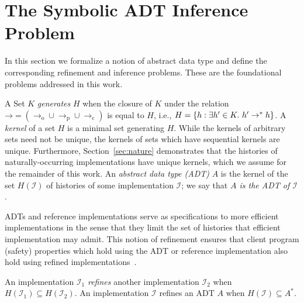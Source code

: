 \section{The Symbolic ADT Inference Problem}
\label{sec:inference}

In this section we formalize a notion of abstract data type and define the
corresponding refinement and inference problems. These are the foundational
problems addressed in this work.

A Set $K$ \emph{generates} $H$ when the closure of $K$ under the relation
$\mathord\to = (\to_\mathrm{o} \cup \to_\mathrm{p} \cup \to_\mathrm{c})$
is equal to $H$, i.e., $H = {\{{ h : \exists h' \in K.\ h' \to^\ast h }\}}$.
A \emph{kernel} of a set $H$ is a minimal set generating $H$. While the kernels
of arbitrary sets need not be unique, the kernels of sets which
have sequential kernels are unique. Furthermore, Section~\ref{sec:nature}
demonstrates that the histories of naturally-occurring implementations have
unique kernels, which we assume for the remainder of this work.
An \emph{abstract data type (ADT)} $A$ is the kernel of the set $H(\mathcal{I})$
of histories of some implementation $\mathcal{I}$; we say that \emph{$A$ is the
ADT of $\mathcal{I}$}.

ADTs and reference implementations serve as specifications to more efficient
implementations in the sense that they limit the set of histories that efficient
implementation may admit. This notion of refinement ensures that client program
(safety) properties which hold using the ADT or reference implementation also
hold using refined implementations~\cite{conf/popl/BouajjaniEEH15}.

\begin{definition}

  An implementation $\mathcal{I}_1$ \emph{refines} another implementation
  $\mathcal{I}_2$ when $H(\mathcal{I}_1) \subseteq H(\mathcal{I}_2)$. An
  implementation $\mathcal{I}$ refines an ADT $A$ when $H(\mathcal{I})
  \subseteq A^*$.

\end{definition}

